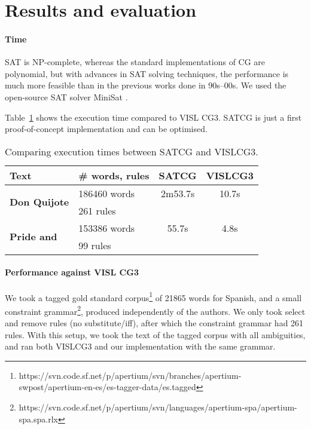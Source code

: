 \documentclass[11pt]{article}
\begin{document}
\section{Results and evaluation}

\paragraph{Time}

SAT is NP-complete, whereas the standard implementations of CG are polynomial, 
but with advances in SAT solving techniques, 
the performance is much more feasible than in the previous works done in 90s--00s.
We used the open-source SAT solver MiniSat \cite{een04sat}.

Table~\ref{table:time} shows the execution time compared to VISL CG3.
SATCG is just a first proof-of-concept implementation and can be optimised.

\begin{table}
  \centering
  \begin{tabular}{|l|l|c|c|}
     \hline
	        \textbf{Text} & \textbf{\# words, rules} &  \textbf{SATCG} & \textbf{VISLCG3} \\ \hline
    \multirow{2}{*}{\textbf{Don Quijote}} & 186460 words  &  2m53.7s & 10.7s \\ 
		                                           & 261 rules & & \\ \hline
    \multirow{2}{*}{\textbf{Pride and}}  & 153386 words& 55.7s  & 4.8s \\ 
                         {\textbf{Prejudice}}                   & 99 rules & \\ \hline
  \end{tabular}
  \caption{Comparing execution times between SATCG and VISLCG3.}
  \label{table:time}
\end{table}

\paragraph{Performance against VISL CG3}


We took a tagged gold standard corpus\footnote{https://svn.code.sf.net/p/apertium/svn/branches/apertium-swpost/apertium-en-es/es-tagger-data/es.tagged} of 21865 words for Spanish, 
and a small constraint grammar\footnote{https://svn.code.sf.net/p/apertium/svn/languages/apertium-spa/apertium-spa.spa.rlx}, produced independently of the authors.
We only took select and remove rules (no substitute/iff), after which the constraint grammar had 261 rules.
With this setup, we took the text of the tagged corpus with all ambiguities, and ran both VISLCG3 and our implementation with the same grammar. 
\end{document}
